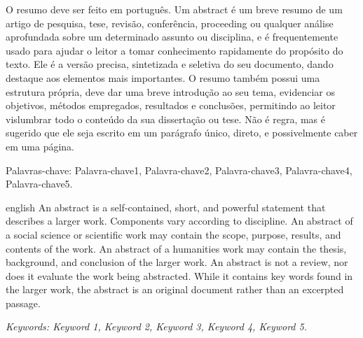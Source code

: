\documentclass[
	12pt,				%
	twoside,			%
	a4paper,			%
	chapter=TITLE,		%
	section=TITLE,		%
	subsection=TITLE,	%
	subsubsection=TITLE,%
	english,			%
	french,				%
	spanish,			%
	brazil,				%
	]{abntex2}
\begin{document}
\begin{resumo}
    O resumo deve ser feito em português. 
    Um abstract é um breve resumo de um artigo de pesquisa, tese, revisão, conferência, proceeding ou qualquer análise aprofundada sobre um determinado assunto ou disciplina, e é frequentemente usado para ajudar o leitor a tomar conhecimento rapidamente do propósito do texto.
    Ele é a versão precisa, sintetizada e seletiva do seu documento, dando destaque aos elementos mais importantes. O resumo também possui uma estrutura própria, deve dar uma breve introdução ao seu tema, evidenciar os objetivos, métodos empregados, resultados e conclusões, permitindo ao leitor vislumbrar todo o conteúdo da sua dissertação ou tese. Não é regra, mas é sugerido que ele seja escrito em um parágrafo único, direto, e possivelmente caber em uma página. 
    
        
    Palavras-chave: Palavra-chave1, Palavra-chave2, Palavra-chave3, Palavra-chave4, Palavra-chave5.

\end{resumo}

\begin{resumo}[Abstract]
    \begin{otherlanguage*}{english}
        An abstract is a self-contained, short, and powerful statement that describes a larger work. Components vary according to discipline. An abstract of a social science or scientific work may contain the scope, purpose, results, and contents of the work. An abstract of a humanities work may contain the thesis, background, and conclusion of the larger work. An abstract is not a review, nor does it evaluate the work being abstracted. While it contains key words found in the larger work, the abstract is an original document rather than an excerpted passage.

        \textit{Keywords: Keyword 1, Keyword 2, Keyword 3, Keyword 4, Keyword 5.}
    \end{otherlanguage*}
\end{resumo}

\listoffigures*
\cleardoublepage


\cleardoublepage

\tableofcontents*
\cleardoublepage
\end{document}

